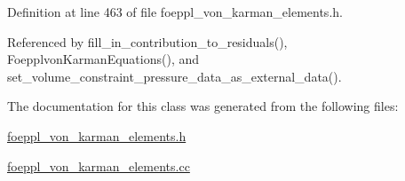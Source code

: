Definition at line 463 of file foeppl\+\_\+von\+\_\+karman\+\_\+elements.\+h.



Referenced by fill\+\_\+in\+\_\+contribution\+\_\+to\+\_\+residuals(), Foepplvon\+Karman\+Equations(), and set\+\_\+volume\+\_\+constraint\+\_\+pressure\+\_\+data\+\_\+as\+\_\+external\+\_\+data().



The documentation for this class was generated from the following files\+:\begin{DoxyCompactItemize}
\item 
\hyperlink{foeppl__von__karman__elements_8h}{foeppl\+\_\+von\+\_\+karman\+\_\+elements.\+h}\item 
\hyperlink{foeppl__von__karman__elements_8cc}{foeppl\+\_\+von\+\_\+karman\+\_\+elements.\+cc}\end{DoxyCompactItemize}
